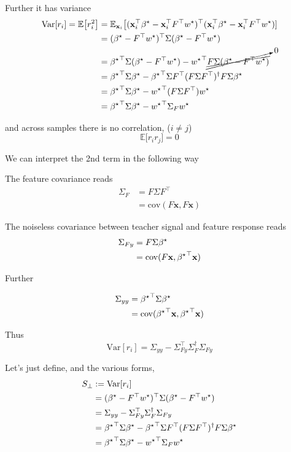 Further it has variance
\begin{align*}
\mathrm{Var}[r_{i}]=\mathbb{E}\big[r_{i}^{2}\big] & =\mathbb{E}_{\mathbf{x}_{i}}\big[(\mathbf{x}_{i}^{\top}{\beta^{\star}}-\mathbf{x}_{i}^{\top}F^{\top}w^{\star})^{\top}(\mathbf{x}_{i}^{\top}{\beta^{\star}}-\mathbf{x}_{i}^{\top}F^{\top}w^{\star})]\\
 & =({\beta^{\star}}-F^{\top}w^{\star})^{\top}\Sigma({\beta^{\star}}-F^{\top}w^{\star})\\
 & ={{\beta^{\star}}}^{\top}\Sigma({\beta^{\star}}-F^{\top}w^{\star})-{w^\star}^{\top}\cancelto{0}{\cancel{F\Sigma({\beta^{\star}}-F^{\top}w^{\star})}}\\
 & ={{\beta^{\star}}}^{\top}\Sigma{\beta^{\star}}-{{\beta^{\star}}}^{\top}\Sigma F^{\top}(F\Sigma F^{\top})^{\dagger}F\Sigma{\beta^{\star}}\\
 & ={{\beta^{\star}}}^{\top}\Sigma{\beta^{\star}}-{w^\star}^{\top}(F\Sigma F^{\top})w^{\star}\\
 & ={{\beta^{\star}}}^{\top}\Sigma{\beta^{\star}}-{w^\star}^{\top}\Sigma_{F}w^{\star}
\end{align*}

and across samples there is no correlation, ($i\neq j$)
\[
\mathbb{E}\big[r_{i}r_{j}\big]=0
\]

We can interpret the 2nd term in the following way

The feature covariance reads
\begin{align*}
\Sigma_{F} & =F\Sigma F^{\top}\\
 & =\mathrm{cov}(F\mathbf{x},F\mathbf{x})
\end{align*}

The noiseless covariance between teacher signal and feature response
reads
\begin{align*}
\Sigma_{Fy} & =F\Sigma{\beta^{\star}}\\
 & =\mathrm{cov}(F\mathbf{x},{{\beta^{\star}}}^{\top}\mathbf{x})
\end{align*}

Further

\begin{align*}
\Sigma_{yy} & ={{\beta^{\star}}}^{\top}\Sigma{\beta^{\star}}\\
 & =\mathrm{cov}({{\beta^{\star}}}^{\top}\mathbf{x},{{\beta^{\star}}}^{\top}\mathbf{x})
\end{align*}

Thus
\[
\mathrm{Var}[r_{i}]=\Sigma_{yy}-\Sigma_{Fy}^{\top}\Sigma_{F}^{\dagger}\Sigma_{Fy}
\]

Let's just define, and the various forms,
\begin{align}
S_{\perp} & :=\mathrm{Var}[r_{i}]\nonumber \\
 & =({\beta^{\star}}-F^{\top}w^{\star})^{\top}\Sigma({\beta^{\star}}-F^{\top}w^{\star})\label{eq:non_reducible_var_def}\\
 & =\Sigma_{yy}-\Sigma_{Fy}^{\top}\Sigma_{F}^{\dagger}\Sigma_{Fy}\nonumber \\
 & ={{\beta^{\star}}}^{\top}\Sigma{\beta^{\star}}-{{\beta^{\star}}}^{\top}\Sigma F^{\top}(F\Sigma F^{\top})^{\dagger}F\Sigma{\beta^{\star}}\nonumber \\
 & ={{\beta^{\star}}}^{\top}\Sigma{\beta^{\star}}-{w^\star}^{\top}\Sigma_{F}w^{\star}
\end{align}


